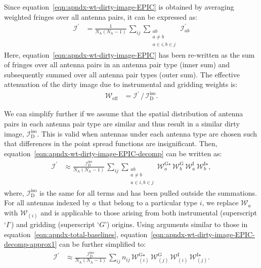 \documentclass[a4paper,fleqn,usenatbib]{mnras}
\newcommand{\Nant}{N_\textrm{A}}
\begin{document}
Since equation~\ref{eqn:apndx-wt-dirty-image-EPIC} is obtained by averaging weighted fringes over all antenna pairs, it can be expressed as: 
\begin{align}\label{eqn:apndx-wt-dirty-image-EPIC-decomp}
  \mathcal{I}^\prime &= \frac{1}{\Nant(\Nant-1)}\,\sum_{ij}\sum_{\substack{ab\\a\ne b\\a\in i, b\in j}}\,\mathcal{I}^\prime_{ab}
\end{align}
Here, equation~\ref{eqn:apndx-wt-dirty-image-EPIC} has been re-written as the sum of fringes over all antenna pairs in an antenna pair type (inner sum) and subsequently summed over all antenna pair types (outer sum). The effective attenuation of the dirty image due to instrumental and gridding weights is:
\begin{align}\label{eqn:apndx-effective-weighting}
  \mathcal{W}_\textrm{eff} &= \mathcal{I}^\prime\, / \,\mathcal{I}_\textrm{D}^\textrm{iso}.
\end{align}

We can simplify further if we assume that the spatial distribution of antenna pairs in each antenna pair type are similar and thus result in a similar dirty image, $\mathcal{I}_\textrm{D}^\textrm{iso}$. This is valid when antennas under each antenna type are chosen such that differences in the point spread functions are insignificant. Then, equation~\ref{eqn:apndx-wt-dirty-image-EPIC-decomp} can be written as:
\begin{align}\label{eqn:apndx-wt-dirty-image-EPIC-decomp-approx1}
  \mathcal{I}^\prime &\approx \frac{\mathcal{I}_\textrm{D}^\textrm{iso}}{\Nant(\Nant-1)}\,\sum_{ij}\sum_{\substack{ab\\a\ne b\\a\in i, b\in j}} \mathcal{W}^{\textrm{G}\star}_a\,\mathcal{W}^\textrm{G}_b\,\mathcal{W}^\textrm{I}_a\,\mathcal{W}^{\textrm{I}\star}_b,
\end{align}
where, $\mathcal{I}_\textrm{D}^\textrm{iso}$ is the same for all terms and has been pulled outside the summations. For all antennas indexed by $a$ that belong to a particular type $i$, we replace $\mathcal{W}_a$ with $\mathcal{W}_{(i)}$ and is applicable to those arising from both instrumental (superscript `$I$') and gridding (superscript `$G$') origins. Using arguments similar to those in equation~\ref{eqn:apndx-total-baselines}, equation~\ref{eqn:apndx-wt-dirty-image-EPIC-decomp-approx1} can be further simplified to:
\begin{align}\label{eqn:apndx-wt-dirty-image-EPIC-decomp-approx2}
  \mathcal{I}^\prime &\approx \frac{\mathcal{I}_\textrm{D}^\textrm{iso}}{\Nant(\Nant-1)}\,\sum_{ij}n_{ij}\,\mathcal{W}^{\textrm{G}\star}_{(i)}\,\mathcal{W}^\textrm{G}_{(j)}\,\mathcal{W}^\textrm{I}_{(i)}\,\mathcal{W}^{\textrm{I}\star}_{(j)}.
\end{align}
\end{document}
